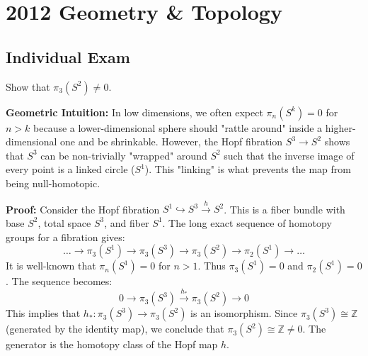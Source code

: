 \section{2012 Geometry \& Topology}

\clearpage

\subsection{Individual Exam}

\begin{exercise}
\label{geometry:2012:1}
Show that $\pi_{3}(S^{2}) \neq 0$.
\end{exercise}

\begin{solution}
\textbf{Geometric Intuition:} In low dimensions, we often expect $\pi_n(S^k) = 0$ for $n > k$ because a lower-dimensional sphere should "rattle around" inside a higher-dimensional one and be shrinkable. However, the Hopf fibration $S^3 \to S^2$ shows that $S^3$ can be non-trivially "wrapped" around $S^2$ such that the inverse image of every point is a linked circle ($S^1$). This "linking" is what prevents the map from being null-homotopic.

\textbf{Proof:} Consider the Hopf fibration $S^1 \hookrightarrow S^3 \xrightarrow{h} S^2$. This is a fiber bundle with base $S^2$, total space $S^3$, and fiber $S^1$. The long exact sequence of homotopy groups for a fibration gives:
\[ \dots \to \pi_3(S^1) \to \pi_3(S^3) \to \pi_3(S^2) \to \pi_2(S^1) \to \dots \]
It is well-known that $\pi_n(S^1) = 0$ for $n > 1$. Thus $\pi_3(S^1) = 0$ and $\pi_2(S^1) = 0$. The sequence becomes:
\[ 0 \to \pi_3(S^3) \xrightarrow{h_*} \pi_3(S^2) \to 0 \]
This implies that $h_*: \pi_3(S^3) \to \pi_3(S^2)$ is an isomorphism. Since $\pi_3(S^3) \cong \mathbb{Z}$ (generated by the identity map), we conclude that $\pi_3(S^2) \cong \mathbb{Z} \neq 0$. The generator is the homotopy class of the Hopf map $h$.
\end{solution}

